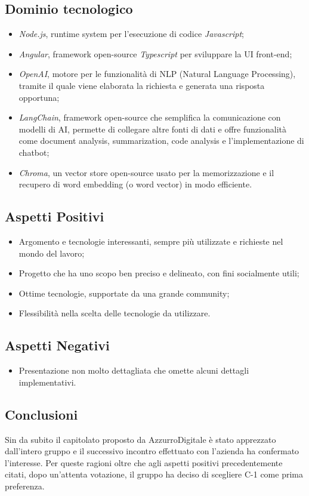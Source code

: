 \documentclass{article}
\begin{document}
\subsection{Dominio tecnologico}
\begin{itemize}
    \item \textit{Node.js}, runtime system per l’esecuzione di codice \textit{Javascript};
    \item \textit{Angular}, framework open-source \textit{Typescript} per sviluppare la UI front-end;
    \item \textit{OpenAI}, motore per le funzionalità di NLP (Natural Language Processing), tramite il quale viene elaborata la richiesta e generata una risposta opportuna;
    \item \textit{LangChain}, framework open-source che semplifica la comunicazione con modelli di AI, permette di collegare altre fonti di dati e offre funzionalità come document analysis, summarization, code analysis e l’implementazione di chatbot;
    \item \textit{Chroma}, un vector store open-source usato per la memorizzazione e il recupero di word embedding (o word vector) in modo efficiente.
\end{itemize}

\subsection{Aspetti Positivi}
\begin{itemize}
    \item Argomento e tecnologie interessanti, sempre più utilizzate e richieste nel mondo del lavoro;
    \item Progetto che ha uno scopo ben preciso e delineato, con fini socialmente utili;
    \item Ottime tecnologie, supportate da una grande community;
    \item Flessibilità nella scelta delle tecnologie da utilizzare.
\end{itemize}
\subsection{Aspetti Negativi}
\begin{itemize}
    \item Presentazione non molto dettagliata che omette alcuni dettagli implementativi.
\end{itemize}

\subsection{Conclusioni}
Sin da subito il capitolato proposto da AzzurroDigitale è stato apprezzato dall’intero gruppo e il successivo incontro effettuato con l’azienda ha confermato l’interesse. Per queste ragioni oltre che agli aspetti positivi precedentemente citati, dopo un’attenta votazione, il gruppo ha deciso di scegliere C-1 come prima preferenza.
\end{document}
